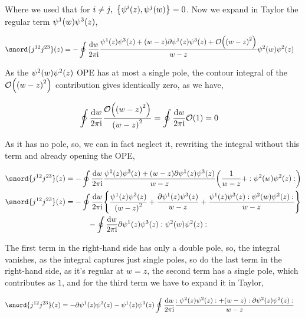 Where we used that for $i\neq j,\ \acomm{\psi^i\qty(z)}{\psi^j\qty(w)}=0$. Now we expand in Taylor the regular term $\psi^1\qty(w)\psi^3\qty(z)$, 

\begin{align*}
    \snord{j^{12}j^{23}}\qty(z)&=-\oint\frac{\dd{w}}{2\pi\im}\frac{\psi^1\qty(z)\psi^3\qty(z)+\qty(w-z)\partial\psi^1\qty(z)\psi^3\qty(z)+\mathcal O\qty(\qty(w-z)^2)}{w-z}\psi^2\qty(w)\psi^2\qty(z)
\end{align*}

As the $\psi^2\qty(w)\psi^2\qty(z)$ OPE has at most a single pole, the contour integral of the $\mathcal O\qty(\qty(w-z)^2)$ contribution 
gives identically zero, as we have,

\begin{align*}
    \oint\frac{\dd{w}}{2\pi\textnormal{i}}\frac{\mathcal O\qty(\qty(w-z) ^2)}{\qty(w-z)^2}&=\oint\frac{\dd{w}}{2\pi\textnormal{i}}\mathcal O\qty(1)=0
\end{align*}

As it has no pole, so, we can in fact neglect it, rewriting the integral without this term and already opening the OPE,

\begin{align*}
    \snord{j^{12}j^{23}}\qty(z)&=-\oint\frac{\dd{w}}{2\pi\im}\frac{\psi^1\qty(z)\psi^3\qty(z)+\qty(w-z)\partial\psi^1\qty(z)\psi^3\qty(z)}{w-z}\qty(\frac{1}{w-z}+\cnord{\psi^2\qty(w)\psi^2\qty(z)})\\
    \snord{j^{12}j^{23}}\qty(z)&=-\oint\frac{\dd{w}}{2\pi\im}\qty{\frac{\psi^1\qty(z)\psi^3\qty(z)}{\qty(w-z)^2}+\frac{\partial\psi^1\qty(z)\psi^3\qty(z)}{w-z}+\frac{\psi^1\qty(z)\psi^3\qty(z)\cnord{\psi^2\qty(w)\psi^2\qty(z)}}{w-z}}\\
    &\quad\quad\quad-\oint\frac{\dd{w}}{2\pi\im}\partial\psi^1\qty(z)\psi^3\qty(z)\cnord{\psi^2\qty(w)\psi^2\qty(z)}
\end{align*}

The first term in the right-hand side has only a double pole, so, the integral vanishes, as the integral captures just single poles, so do the 
last term in the right-hand side, as it's regular at $w=z$, the second term has a single pole, which contributes as $1$, and for the third term we have to expand it in Taylor,

\begin{align*}
    \snord{j^{12}j^{23}}\qty(z)&=-\partial\psi^1\qty(z)\psi^3\qty(z)-\psi^1\qty(z)\psi^3\qty(z)\oint\frac{\dd{w}}{2\pi\im}\frac{\cnord{\psi^2\qty(z)\psi^2\qty(z)}+\qty(w-z)\cnord{\partial\psi^2\qty(z)\psi^2\qty(z)}}{w-z}
\end{align*}


